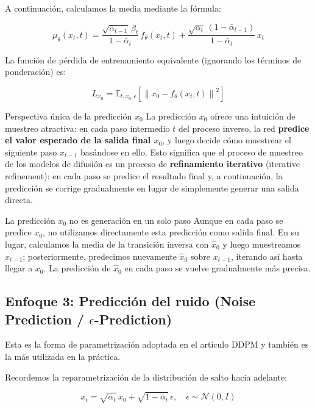 A continuación, calculamos la media mediante la fórmula:

$$\mu_\theta(x_t, t) = \frac{\sqrt{\bar{\alpha}_{t-1}}\, \beta_t}{1 - \bar{\alpha}_t}\, f_\theta(x_t, t) + \frac{\sqrt{\alpha_t}\, (1 - \bar{\alpha}_{t-1})}{1 - \bar{\alpha}_t}\, x_t$$

La función de pérdida de entrenamiento equivalente (ignorando los términos de ponderación) es:

$$L_{x_0} = \mathbb{E}_{t, x_0, \epsilon}\left[\left\| x_0 - f_\theta(x_t, t) \right\|^2\right]$$

\begin{importantbox}{Perspectiva única de la predicción $x_0$}
La predicción $x_0$ ofrece una intuición de muestreo atractiva: en cada paso intermedio $t$ del proceso inverso, la red \textbf{predice el valor esperado de la salida final $x_0$}, y luego decide cómo muestrear el siguiente paso $x_{t-1}$ basándose en ello. Esto significa que el proceso de muestreo de los modelos de difusión es un proceso de \textbf{refinamiento iterativo} (iterative refinement): en cada paso se predice el resultado final y, a continuación, la predicción se corrige gradualmente en lugar de simplemente generar una salida directa.
\end{importantbox}

\begin{warningbox}{La predicción $x_0$ no es generación en un solo paso}
Aunque en cada paso se predice $x_0$, no utilizamos directamente esta predicción como salida final. En su lugar, calculamos la media de la transición inversa con $\hat{x}_0$ y luego muestreamos $x_{t-1}$; posteriormente, predecimos nuevamente $\hat{x}_0$ sobre $x_{t-1}$, iterando así hasta llegar a $x_0$. La predicción de $\hat{x}_0$ en cada paso se vuelve gradualmente más precisa.
\end{warningbox}

\subsection{Enfoque 3: Predicción del ruido (Noise Prediction / $\epsilon$-Prediction)}

Esta es la forma de parametrización adoptada en el artículo DDPM y también es la más utilizada en la práctica.

Recordemos la reparametrización de la distribución de salto hacia adelante:

$$x_t = \sqrt{\bar{\alpha}_t}\, x_0 + \sqrt{1 - \bar{\alpha}_t}\, \epsilon, \quad \epsilon \sim \mathcal{N}(0, I)$$

